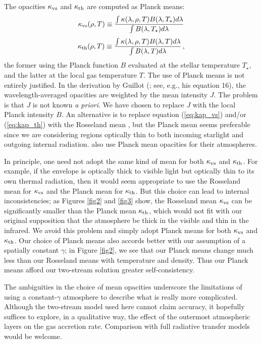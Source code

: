 \documentclass[fleqn,useAMS,usenatbib]{mnras}
\begin{document}
The opacities $\kappa_{\rm vs}$ and $\kappa_{\rm th}$
are computed as Planck means:
%
\begin{equation}
    \kappa_{\rm vs} (\rho, T) \equiv \frac{\int \kappa(\lambda, \rho, T) B(\lambda, T_{\star}) d\lambda}{\int B(\lambda, T_{\star}) d\lambda}
    \label{eq:kap_vs}
\end{equation}
%
\begin{equation}
    \kappa_{\rm th} (\rho, T) \equiv \frac{\int \kappa(\lambda, \rho, T) B(\lambda, T) d\lambda}{\int B(\lambda, T) d\lambda} \,,
    \label{eq:kap_th}
\end{equation}
%
the former using the Planck function $B$ evaluated at the stellar
temperature $T_\star$, and the latter at the local gas temperature $T$.
The use of Planck means is not entirely justified.
In the derivation by Guillot (\citeyear{guillot10};
see, e.g., his equation 16),
the wavelength-averaged opacities are weighted by the
mean intensity $J$. The problem is that
$J$ is not known {\it a priori}. We have chosen to replace $J$
with the local Planck intensity $B$. An alternative is to 
replace equation (\ref{eq:kap_vs}) and/or (\ref{eq:kap_th}) with
the Rosseland mean \citep[e.g.,][]{rogers11}, but the Planck
mean seems preferable since we are considering regions optically
thin to both incoming starlight and outgoing internal radiation.
\citet{hubeny03} also use Planck mean opacities for their
atmospheres.

In principle, one need not adopt the same kind of mean for both
$\kappa_{\rm vs}$ and $\kappa_{\rm th}$.
For example, if the envelope is 
optically thick to visible light but optically thin to its own thermal
radiation, then it would seem appropriate to use the
Rosseland mean for $\kappa_{\rm vs}$ and the Planck mean
for $\kappa_{\rm th}$. But this choice can lead to
internal inconsistencies; as Figures \ref{fig2} and \ref{fig3} show,
the Rosseland mean $\kappa_{\rm vs}$ can be significantly smaller
than the Planck mean $\kappa_{\rm th}$,
which would not fit with our original supposition
that the atmosphere be thick in the visible
and thin in the infrared.
We avoid this problem and simply adopt Planck means for both
$\kappa_{\rm vs}$ and $\kappa_{\rm th}$. 
Our choice of Planck means also accords 
better with our assumption 
of a spatially constant $\gamma$; in Figure \ref{fig2},
we see that our Planck means change much less than our Rosseland
means with temperature and density. Thus our Planck
means afford our two-stream solution greater self-consistency.

The ambiguities
in the choice of mean opacities underscore the limitations of using
a constant-$\gamma$ atmosphere to describe
what is really more complicated. Although the two-stream
model used here cannot claim accuracy,
it hopefully suffices to explore, in a qualitative way, 
the effect of the outermost
atmospheric layers on the gas accretion rate.
Comparison with full radiative transfer models 
would be welcome.
\end{document}
